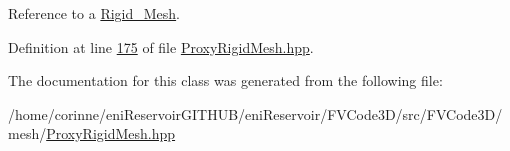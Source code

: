 Reference to a \hyperlink{classFVCode3D_1_1Rigid__Mesh}{Rigid\+\_\+\+Mesh}. 



Definition at line \hyperlink{ProxyRigidMesh_8hpp_source_l00175}{175} of file \hyperlink{ProxyRigidMesh_8hpp_source}{Proxy\+Rigid\+Mesh.\+hpp}.



The documentation for this class was generated from the following file\+:\begin{DoxyCompactItemize}
\item 
/home/corinne/eni\+Reservoir\+G\+I\+T\+H\+U\+B/eni\+Reservoir/\+F\+V\+Code3\+D/src/\+F\+V\+Code3\+D/mesh/\hyperlink{ProxyRigidMesh_8hpp}{Proxy\+Rigid\+Mesh.\+hpp}\end{DoxyCompactItemize}
